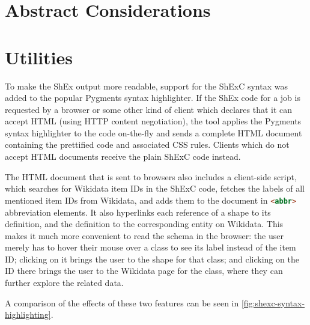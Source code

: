 \section{Abstract Considerations}
\label{sec:wdsi:abstract}


\section{Utilities}
\label{sec:wdsi:utilities}

To make the ShEx output more readable,
support for the ShExC syntax was added to the popular Pygments syntax highlighter. %
If the ShEx code for a job %
is requested by a browser
or some other kind of client which declares that it can accept HTML
(using HTTP content negotiation),
the tool applies the Pygments syntax highlighter to the code on-the-fly
and sends a complete HTML document containing the prettified code and associated CSS rules.
Clients which do not accept HTML documents receive the plain ShExC code instead.

The HTML document that is sent to browsers
also includes a client-side script,
which searches for Wikidata item IDs in the ShExC code,
fetches the labels of all mentioned item IDs from Wikidata,
and adds them to the document in \lstinline[language=html]{<abbr>} abbreviation elements.
It also hyperlinks each reference of a shape to its definition,
and the definition to the corresponding entity on Wikidata.
This makes it much more convenient to read the schema in the browser:
the user merely has to hover their mouse over a class to see its label instead of the item ID;
clicking on it brings the user to the shape for that class;
and clicking on the ID there brings the user to the Wikidata page for the class,
where they can further explore the related data.

A comparison of the effects of these two features
can be seen in \cref{fig:shexc-syntax-highlighting}.

